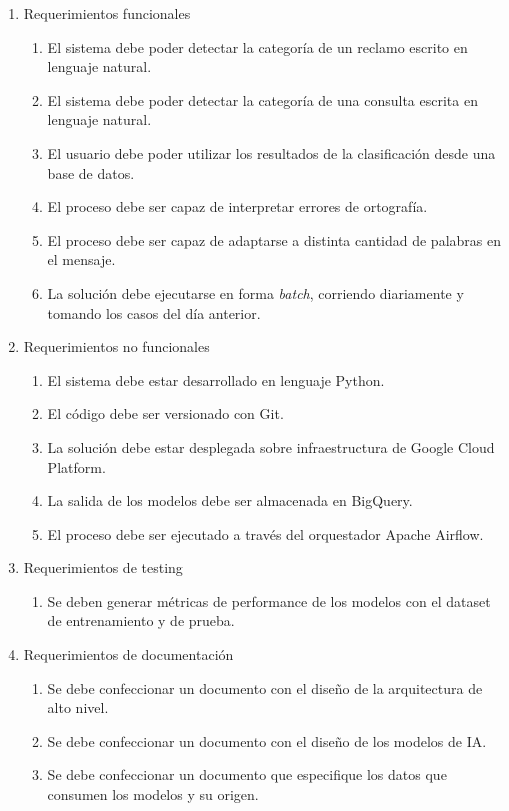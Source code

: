 \documentclass[
11pt, %
]{charter}
\begin{document}
\begin{enumerate}
	\item Requerimientos funcionales
		\begin{enumerate}
			\item El sistema debe poder detectar la categoría de un reclamo escrito en lenguaje natural.
			\item El sistema debe poder detectar la categoría de una consulta escrita en lenguaje natural.
			\item El usuario debe poder utilizar los resultados de la clasificación desde una base de datos.
			\item El proceso debe ser capaz de interpretar errores de ortografía.
			\item El proceso debe ser capaz de adaptarse a distinta cantidad de palabras en el mensaje.
			\item La solución debe ejecutarse en forma \textit{batch}, corriendo diariamente y tomando los casos del día anterior.
		\end{enumerate}
	\item Requerimientos no funcionales
		\begin{enumerate}
			\item El sistema debe estar desarrollado en lenguaje Python.
			\item El código debe ser versionado con Git.
			\item La solución debe estar desplegada sobre infraestructura de Google Cloud Platform.
			\item La salida de los modelos debe ser almacenada en BigQuery.
			\item El proceso debe ser ejecutado a través del orquestador Apache Airflow.
		\end{enumerate}
	\item Requerimientos de testing
		\begin{enumerate}
			\item Se deben generar métricas de performance de los modelos con el dataset de entrenamiento y de prueba.
		\end{enumerate}
	\item Requerimientos de documentación
		\begin{enumerate}
			\item Se debe confeccionar un documento con el diseño de la arquitectura de alto nivel.
			\item Se debe confeccionar un documento con el diseño de los modelos de IA.
			\item Se debe confeccionar un documento que especifique los datos que consumen los modelos y su origen.
		\end{enumerate}
\end{enumerate}
\end{document}
